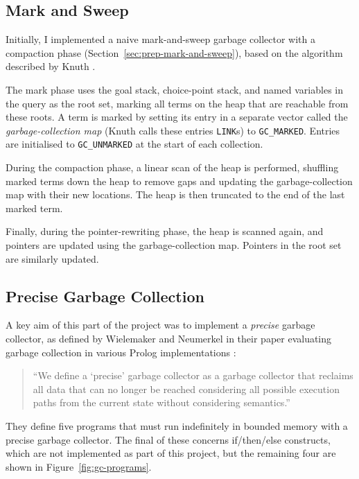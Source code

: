 \subsection{Mark and Sweep}

\label{sec:mark-and-sweep}

Initially, I implemented a naive mark-and-sweep garbage collector with a compaction phase (Section~\ref{sec:prep-mark-and-sweep}), based on the algorithm described by Knuth \cite{knuthArtComputerProgramming1997}.

The mark phase uses the goal stack, choice-point stack, and named variables in the query as the root set, marking all terms on the heap that are reachable from these roots. A term is marked by setting its entry in a separate vector called the \emph{garbage-collection map} (Knuth calls these entries \texttt{LINK}s) to \texttt{GC\_MARKED}. Entries are initialised to \texttt{GC\_UNMARKED} at the start of each collection.

During the compaction phase, a linear scan of the heap is performed, shuffling marked terms down the heap to remove gaps and updating the garbage-collection map with their new locations. The heap is then truncated to the end of the last marked term.

Finally, during the pointer-rewriting phase, the heap is scanned again, and pointers are updated using the garbage-collection map. Pointers in the root set are similarly updated.

\subsection{Precise Garbage Collection}

\label{sec:precise-gc}

A key aim of this part of the project was to implement a \emph{precise} garbage collector, as defined by Wielemaker and Neumerkel in their paper evaluating garbage collection in various Prolog implementations \cite{wielemakerPreciseGarbageCollection2008}:

\begin{quote}
``We define a `precise' garbage collector as a garbage collector that reclaims all data that can no longer be reached considering all possible execution paths from the current state without considering semantics.''
\end{quote}

They define five programs that must run indefinitely in bounded memory with a precise garbage collector. The final of these concerns if/then/else constructs, which are not implemented as part of this project, but the remaining four are shown in Figure~\ref{fig:gc-programs}.

